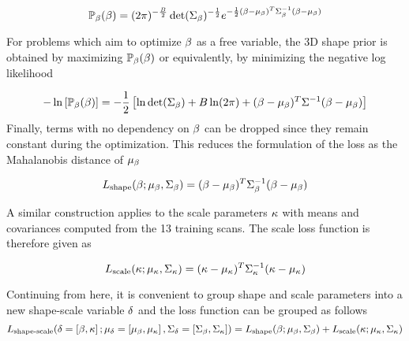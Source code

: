 \begin{equation}
    \mathbb{P}_{\beta}(\beta) = (2\pi)^{-\frac{B}{2}}\det(\Sigma_{\beta})^{-\frac{1}{2}}e^{-\frac{1}{2}(\beta-\mu_{\beta})^{T}\Sigma_{\beta}^{-1}(\beta-\mu_{\beta})}
\end{equation}

For problems which aim to optimize $\beta$ as a free variable, the 3D shape prior is obtained by maximizing $\mathbb{P}_{\beta}(\beta)$ or equivalently, by minimizing the negative log likelihood

\begin{equation}
     -\ln\left[\mathbb{P}_{\beta}(\beta)\right] = -\frac{1}{2}\left[\ln\det(\Sigma_{\beta}) + B\ln(2\pi) +  (\beta - \mu_{\beta})^T\Sigma^{-1}(\beta-\mu_{\beta})\right]
\end{equation}
Finally, terms with no dependency on $\beta$ can be dropped since they remain constant during the optimization. This reduces the formulation of the loss as the Mahalanobis distance of $\mu_{\beta}$

\begin{equation}
    L_{\textrm{shape}}(\beta;\mu_{\beta},\Sigma_{\beta}) = (\beta - \mu_{\beta})^{T}\Sigma_{\beta}^{-1}(\beta - \mu_{\beta})
\end{equation}

A similar construction applies to the scale parameters $\kappa$ with means and covariances computed from the 13 training scans. The scale loss function is therefore given as

\begin{equation}
    L_{\textrm{scale}}(\kappa;\mu_{\kappa},\Sigma_{\kappa})= (\kappa - \mu_{\kappa})^{T}\Sigma_{\kappa}^{-1}(\kappa - \mu_{\kappa})
\end{equation}

Continuing from here, it is convenient to group shape and scale parameters into a new shape-scale variable $\delta$ and the loss function can be grouped as follows
\begin{equation}
    L_{\textrm{shape-scale}}(\delta=\left[\beta,\kappa\right];\mu_{\delta}=\left[\mu_{\beta},\mu_{\kappa}\right],\Sigma_{\delta}=\left[\Sigma_{\beta},\Sigma_{\kappa}\right]) = L_{\textrm{shape}}(\beta;\mu_{\beta},\Sigma_{\beta}) + L_{\textrm{scale}}(\kappa;\mu_{\kappa},\Sigma_{\kappa})
\end{equation}




